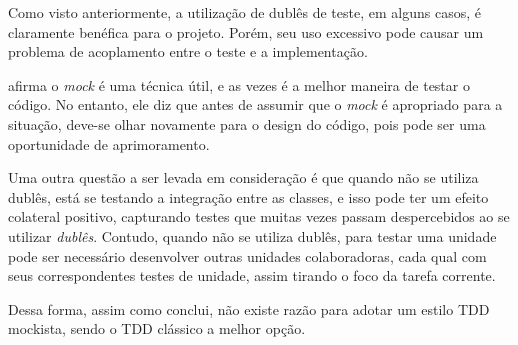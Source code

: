 Como visto anteriormente, a utilização de dublês de teste, em alguns casos, é claramente benéfica para o projeto. Porém, seu uso excessivo pode causar um problema de acoplamento entre o teste e a implementação.

 afirma o \textit{mock} é uma técnica útil, e as vezes é a melhor maneira de testar o código. No entanto, ele diz que antes de assumir que o \textit{mock} é apropriado para a situação, deve-se olhar novamente para o design do código, pois pode ser uma oportunidade de aprimoramento.

Uma outra questão a ser levada em consideração é que quando não se utiliza dublês, está se testando a integração entre as classes, e isso pode ter um efeito colateral positivo, capturando testes que muitas vezes passam despercebidos ao se utilizar \textit{dublês}. Contudo, quando não se utiliza dublês, para testar uma unidade pode ser necessário desenvolver outras unidades colaboradoras, cada qual com seus correspondentes testes de unidade, assim tirando o foco da tarefa corrente.

Dessa forma, assim como  conclui, não existe razão para adotar um estilo TDD mockista, sendo o TDD clássico a melhor opção.